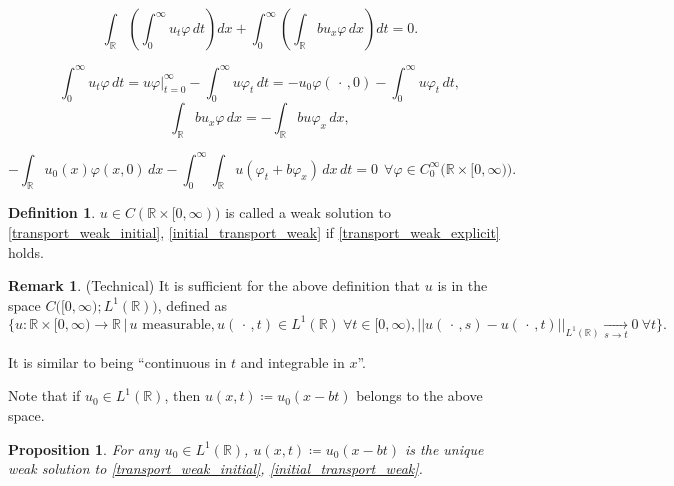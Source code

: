 \documentclass[12pt]{article}
\newtheorem{proposition}{Proposition}[section]
\theoremstyle{definition}
\newtheorem*{definition*}{Definition}
\newtheorem*{remark}{Remark}
\begin{document}
\[\int_{\mathbb{R}}\left(\int_0^{\infty}u_t\varphi\,dt\right)dx+\int_0^{\infty}\left(\int_{\mathbb{R}}bu_x\varphi\,dx\right)dt=0.\]

\[\int_0^{\infty}u_t\varphi\,dt=u\varphi\Big|_{t=0}^{\infty}-\int_0^{\infty}u\varphi_t\,dt=-u_0\varphi(\,\cdot\,,0)-\int_0^{\infty}u\varphi_t\,dt,\]
\[\int_{\mathbb{R}}bu_x\varphi\,dx=-\int_{\mathbb{R}}bu\varphi_x\,dx,\]

\begin{equation}\tag{$*$}\label{transport_weak_explicit}
-\int_{\mathbb{R}}u_0(x)\varphi(x,0)\,dx-\int_0^{\infty}\int_{\mathbb{R}}u(\varphi_t+b\varphi_x)\,dx\,dt=0\ \ \forall\varphi\in C_0^{\infty}\big(\mathbb{R}\times[0,\infty)\big).
\end{equation}

\begin{definition*}
$u\in C(\mathbb{R}\times[0,\infty))$ is called a weak solution to \eqref{transport_weak_initial}, \eqref{initial_transport_weak} if \eqref{transport_weak_explicit} holds.
\end{definition*}

\begin{remark}
(Technical) It is sufficient for the above definition that $u$ is in the space $C\big([0,\infty);L^1(\mathbb{R})\big)$, defined as
\[\Big\{u:\mathbb{R}\times[0,\infty)\rightarrow\mathbb{R}\,\Big|\,u\text{ measurable},u(\,\cdot\,,t)\in L^1(\mathbb{R})\ \forall t\in[0,\infty),\big|\big|u(\,\cdot\,,s)-u(\,\cdot\,,t)\big|\big|_{L^1(\mathbb{R})}\xrightarrow[s\to t]{}0\ \forall t\Big\}.\]

It is similar to being ``continuous in $t$ and integrable in $x$''.

Note that if $u_0\in L^1(\mathbb{R})$, then $u(x,t)\coloneqq u_0(x-bt)$ belongs to the above space.
\end{remark}

\begin{proposition}
For any $u_0\in L^1(\mathbb{R})$, $u(x,t)\coloneqq u_0(x-bt)$ is the unique weak solution to \eqref{transport_weak_initial}, \eqref{initial_transport_weak}.
\end{proposition}
\end{document}

